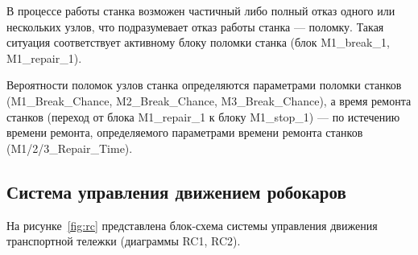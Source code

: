 В процессе работы станка возможен частичный либо полный отказ одного или нескольких узлов, что подразумевает отказ работы станка --- поломку. Такая ситуация соответствует активному блоку поломки станка (блок M1\_break\_1, M1\_repair\_1).

Вероятности поломок узлов станка определяются параметрами поломки станков (M1\_Break\_Chance, M2\_Break\_Chance, M3\_Break\_Chance), а время ремонта станков (переход от блока M1\_repair\_1 к блоку M1\_stop\_1) --- по истечению времени ремонта, определяемого параметрами времени ремонта станков (M1/2/3\_Repair\_Time).

\subsection{Система управления движением робокаров}

На рисунке~\ref{fig:rc} представлена блок-схема системы управления движения транспортной тележки (диаграммы RC1, RC2).


